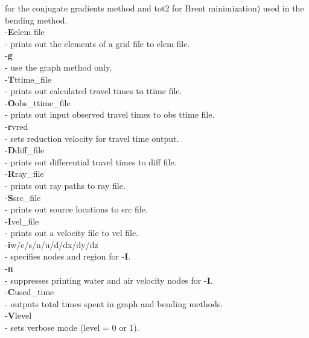 \documentclass[twoside,final,onecolumn]{article}
\newcommand{\forceindent}{\leavevmode{\parindent=1em\indent}}
\begin{document}
\forceindent\forceindent for the conjugate gradients method and tot2 for Brent minimization) used in the bending method.\\[6pt]
\forceindent -\textbf{E}elem file \\
\forceindent\forceindent - prints out the elements of a grid file to elem file.\\[6pt]
\forceindent -\textbf{g} \\
\forceindent\forceindent - use the graph method only.\\[6pt]
\forceindent -\textbf{T}ttime\_file \\
\forceindent\forceindent - prints out calculated travel times to ttime file.\\[6pt]
\forceindent -\textbf{O}obs\_ttime\_file \\
\forceindent\forceindent - prints out input observed travel times to obs ttime file.\\[6pt]
\forceindent -\textbf{r}vred \\
\forceindent\forceindent - sets reduction velocity for travel time output.\\[6pt]
\forceindent -\textbf{D}diff\_file \\
\forceindent\forceindent - prints out differential travel times to diff file.\\[6pt]
\forceindent -\textbf{R}ray\_file \\
\forceindent\forceindent - prints out ray paths to ray file.\\[6pt]
\forceindent -\textbf{S}src\_file \\
\forceindent\forceindent - prints out source locations to src file.\\[6pt]
\forceindent -\textbf{I}vel\_file \\
\forceindent\forceindent - prints out a velocity file to vel file.\\[6pt]
\forceindent -\textbf{i}w/e/s/n/u/d/dx/dy/dz \\
\forceindent\forceindent - specifies nodes and region for -\textbf{I}.\\[6pt]
\forceindent -\textbf{n} \\
\forceindent\forceindent - suppresses printing water and air velocity nodes for -\textbf{I}.\\[6pt]
\forceindent -\textbf{C}used\_time \\
\forceindent\forceindent - outputs total times spent in graph and bending methods. \\[6pt]
\forceindent -\textbf{V}level \\
\forceindent\forceindent - sets verbose mode (level = 0 or 1).
\end{document}
